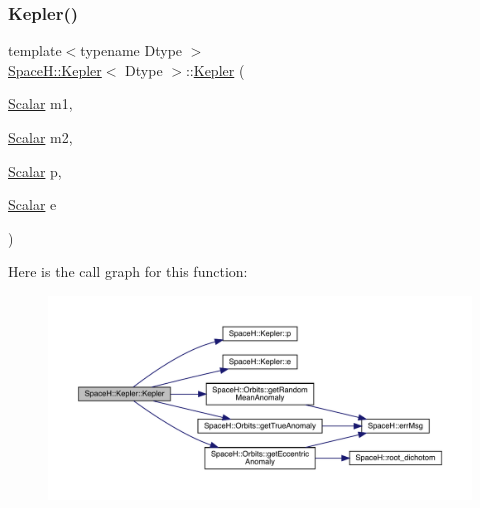 \mbox{\label{struct_space_h_1_1_kepler_a99435c19c0e7c815f067666e374a13e4}} 
\subsubsection{\texorpdfstring{Kepler()}{Kepler()}\hspace{0.1cm}{\footnotesize\ttfamily [2/3]}}
{\footnotesize\ttfamily template$<$typename Dtype $>$ \\
\mbox{\hyperlink{struct_space_h_1_1_kepler}{Space\+H\+::\+Kepler}}$<$ Dtype $>$\+::\mbox{\hyperlink{struct_space_h_1_1_kepler}{Kepler}} (\begin{DoxyParamCaption}\item[{\mbox{\hyperlink{struct_space_h_1_1_kepler_a19291f268209f594a96fb4828fa1a54c}{Scalar}}}]{m1,  }\item[{\mbox{\hyperlink{struct_space_h_1_1_kepler_a19291f268209f594a96fb4828fa1a54c}{Scalar}}}]{m2,  }\item[{\mbox{\hyperlink{struct_space_h_1_1_kepler_a19291f268209f594a96fb4828fa1a54c}{Scalar}}}]{p,  }\item[{\mbox{\hyperlink{struct_space_h_1_1_kepler_a19291f268209f594a96fb4828fa1a54c}{Scalar}}}]{e }\end{DoxyParamCaption})\hspace{0.3cm}{\ttfamily [inline]}}

Here is the call graph for this function\+:
\nopagebreak
\begin{figure}[H]
\begin{center}
\leavevmode
\includegraphics[width=350pt]{struct_space_h_1_1_kepler_a99435c19c0e7c815f067666e374a13e4_cgraph}
\end{center}
\end{figure}
\mbox{\label{struct_space_h_1_1_kepler_ad451c2795f7525d1767d71333a673fc0}} 
